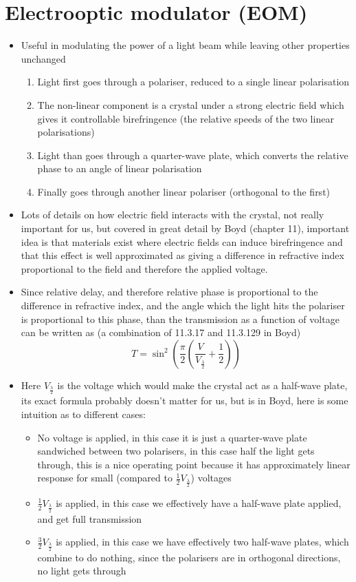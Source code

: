 \documentclass[english]{article}
\begin{document}
\section{Electrooptic modulator (EOM)}
\begin{itemize}
\item Useful in modulating the power of a light beam while leaving other properties unchanged
\begin{enumerate}
\item Light first goes through a polariser, reduced to a single linear polarisation
\item The non-linear component is a crystal under a strong electric field which gives it controllable birefringence (the relative speeds of the two linear polarisations)
\item Light than goes through a quarter-wave plate, which converts the relative phase to an angle of linear polarisation
\item Finally goes through another linear polariser (orthogonal to the first)
\end{enumerate}
\item Lots of details on how electric field interacts with the crystal, not really important for us, but covered in great detail by Boyd (chapter 11), important idea is that materials exist where electric fields can induce birefringence and that this effect is well approximated as giving a difference in refractive index proportional to the field and therefore the applied voltage.
\item Since relative delay, and therefore relative phase is proportional to the difference in refractive index, and the angle which the light hits the polariser is proportional to this phase, than the transmission as a function of voltage can be written as (a combination of 11.3.17 and 11.3.129 in Boyd)
\begin{equation}
T=\sin^2\left(\frac{\pi}{2}\left(\frac{V}{V_{\frac{\lambda}{2}}}+\frac{1}{2}\right)\right)
\end{equation}
\item Here $V_{\frac{\lambda}{2}}$ is the voltage which would make the crystal act as a half-wave plate, its exact formula probably doesn't matter for us, but is in Boyd, here is some intuition as to different cases:
\begin{itemize}
\item No voltage is applied, in this case it is just a quarter-wave plate sandwiched between two polarisers, in this case half the light gets through, this is a nice operating point because it has approximately linear response for small (compared to $\frac{1}{2}V_{\frac{\lambda}{2}}$) voltages 
\item $\frac{1}{2}V_{\frac{\lambda}{2}}$ is applied, in this case we effectively have a half-wave plate applied, and get full transmission
\item $\frac{3}{2}V_{\frac{\lambda}{2}}$ is applied, in this case we have effectively two half-wave plates, which combine to do nothing, since the polarisers are in orthogonal directions, no light gets through
\end{itemize}
\end{itemize}
\end{document}
